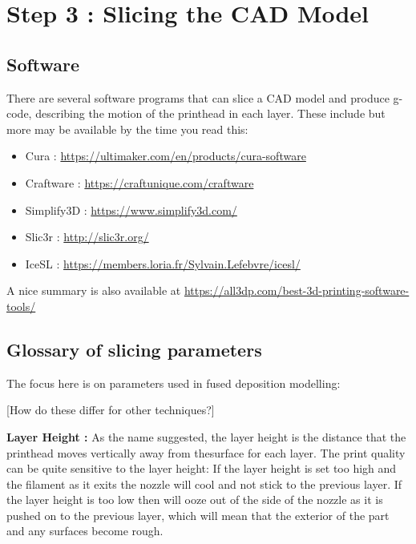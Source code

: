 \newpage
\section{Step 3 : Slicing the CAD Model}

\subsection{Software}

There are several software programs that can slice a CAD model and produce g-code, describing the motion of the printhead in each layer. 
These include but more may be available by the time you read this:  
\begin{itemize}
 \item Cura : \url{https://ultimaker.com/en/products/cura-software}
 \item Craftware : \url{https://craftunique.com/craftware}
 \item Simplify3D : \url{https://www.simplify3d.com/}
 \item Slic3r : \url{http://slic3r.org/}
 \item IceSL : \url{https://members.loria.fr/Sylvain.Lefebvre/icesl/}
\end{itemize}
A nice summary is also available at \url{https://all3dp.com/best-3d-printing-software-tools/}

\subsection{Glossary of slicing parameters}

The focus here is on parameters used in fused deposition modelling: 

[How do these differ for other techniques?]

\textbf{Layer Height :} As the name suggested, the layer height is the distance that the printhead moves vertically away from thesurface for each layer. The print quality can be quite sensitive to the layer height: If the layer height is set too high and the filament as it exits the nozzle will cool and not stick to the previous layer. If the layer height is too low then will ooze out of the side of the nozzle as it is pushed on to the previous layer, which will mean that the exterior of the part and any surfaces become rough.

